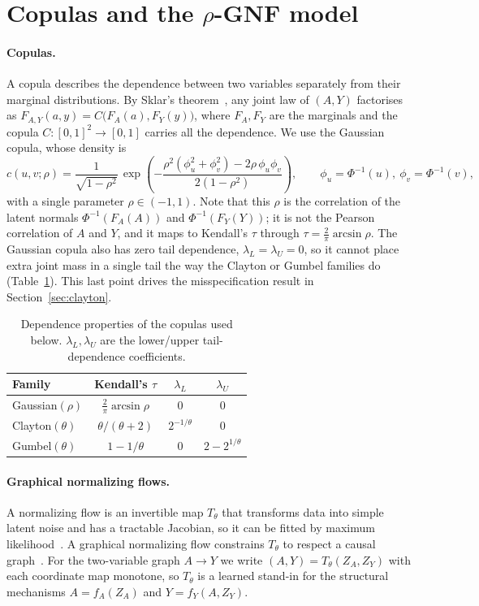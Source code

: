 \documentclass[11pt]{article}
\begin{document}
\section{Copulas and the $\rho$-GNF model}

\paragraph{Copulas.} A copula describes the dependence between two variables
separately from their marginal distributions. By Sklar's
theorem~\cite{nelsen2006copulas}, any joint law of $(A,Y)$ factorises as
$F_{A,Y}(a,y) = C\big(F_A(a),F_Y(y)\big)$, where $F_A,F_Y$ are the marginals and
the copula $C:[0,1]^2\to[0,1]$ carries all the dependence. We use the Gaussian
copula, whose density is
\begin{equation}
  c(u,v;\rho)=\frac{1}{\sqrt{1-\rho^2}}\,
  \exp\!\left(-\frac{\rho^2(\phi_u^2+\phi_v^2)-2\rho\,\phi_u\phi_v}{2(1-\rho^2)}\right),
  \qquad \phi_u=\Phi^{-1}(u),\ \phi_v=\Phi^{-1}(v),
  \label{eq:gausscopdens}
\end{equation}
with a single parameter $\rho\in(-1,1)$. Note that this $\rho$ is the correlation
of the latent normals $\Phi^{-1}(F_A(A))$ and $\Phi^{-1}(F_Y(Y))$; it is not the
Pearson correlation of $A$ and $Y$, and it maps to Kendall's $\tau$ through
$\tau=\tfrac{2}{\pi}\arcsin\rho$. The Gaussian copula also has zero tail
dependence, $\lambda_L=\lambda_U=0$, so it cannot place extra joint mass in a
single tail the way the Clayton or Gumbel families do (Table~\ref{tab:copulas}).
This last point drives the misspecification result in Section~\ref{sec:clayton}.

\begin{table}[h]
\centering
\small
\caption{Dependence properties of the copulas used below. $\lambda_L,\lambda_U$ are
the lower/upper tail-dependence coefficients.}
\label{tab:copulas}
\begin{tabular}{@{}lccc@{}}
\toprule
Family & Kendall's $\tau$ & $\lambda_L$ & $\lambda_U$ \\
\midrule
Gaussian$(\rho)$ & $\tfrac{2}{\pi}\arcsin\rho$ & $0$ & $0$ \\
Clayton$(\theta)$ & $\theta/(\theta+2)$ & $2^{-1/\theta}$ & $0$ \\
Gumbel$(\theta)$  & $1-1/\theta$ & $0$ & $2-2^{1/\theta}$ \\
\bottomrule
\end{tabular}
\end{table}

\paragraph{Graphical normalizing flows.} A normalizing flow is an invertible map
$T_\theta$ that transforms data into simple latent noise and has a tractable
Jacobian, so it can be fitted by maximum likelihood~\cite{papamakarios2017maf}. A
graphical normalizing flow constrains $T_\theta$ to respect a causal
graph~\cite{wehenkel2020gnf}. For the two-variable graph $A\to Y$ we write
$(A,Y)=T_\theta(Z_A,Z_Y)$ with each coordinate map monotone, so $T_\theta$ is a
learned stand-in for the structural mechanisms $A=f_A(Z_A)$ and $Y=f_Y(A,Z_Y)$.
\end{document}
